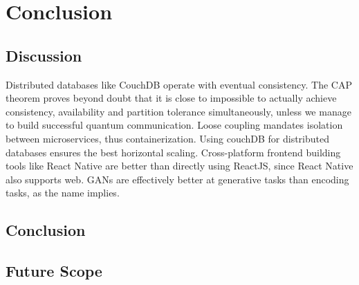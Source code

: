 \chapter{\centering Conclusion}



\section{Discussion}
Distributed databases like CouchDB operate with eventual consistency. The CAP theorem proves beyond doubt that it is close to impossible 
to actually achieve consistency, availability and partition tolerance simultaneously, unless we manage to build successful quantum communication.
Loose coupling mandates isolation between microservices, thus containerization. Using couchDB for distributed databases ensures the best horizontal scaling.
Cross-platform frontend building tools like React Native are better than directly using ReactJS, since React Native also supports web.
GANs are effectively better at generative tasks than encoding tasks, as the name implies.

\section{Conclusion}


\section{Future Scope}

